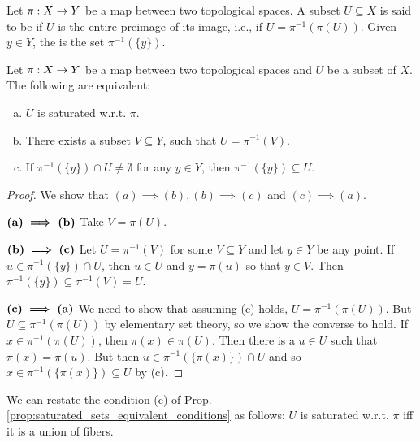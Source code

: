 \documentclass[11pt,a4paper]{article}
\begin{document}
\begin{definition}\label{def:saturated_set}
Let $\pi:X\rightarrow Y$ be a map between two topological spaces. A subset $U\subseteq X$ is said to be  if $U$ is the entire preimage of its image, i.e., if $U = \pi^{-1}(\pi(U))$. Given $y\in Y$, the  is the set $\pi^{-1}(\{y\})$.
\end{definition}

\begin{proposition}\label{prop:saturated_sets_equivalent_conditions}
Let $\pi:X\rightarrow Y$ be a map between two topological spaces and $U$ be a subset of $X$. The following are equivalent:
\begin{enumerate}[(a)]
    \item $U$ is saturated w.r.t. $\pi$.
    \item There exists a subset $V\subseteq Y$, such that $U=\pi^{-1}(V)$.
    \item If $\pi^{-1}(\{y\}) \cap U \neq \emptyset$ for any $y\in Y$, then $\pi^{-1}(\{y\})\subseteq U$.
\end{enumerate}
\end{proposition}

\begin{proof}
We show that $(a)\implies (b), (b)\implies(c)$ and $(c)\implies (a)$.

\noindent$\textbf{(a)}\boldsymbol{\implies}\textbf{(b)}$ Take $V = \pi(U)$.

\noindent$\textbf{(b)}\boldsymbol{\implies}\textbf{(c)}$ Let $U = \pi^{-1}(V)$ for some $V\subseteq Y$ and let $y\in Y$ be any point. If $u\in \pi^{-1}(\{y\})\cap U$, then $u\in U$ and $y = \pi(u)$ so that $y\in V$. Then $\pi^{-1}(\{y\})\subseteq \pi^{-1}(V) = U$.

\noindent$\textbf{(c)}\boldsymbol{\implies}\textbf{(a)}$ We need to show that assuming (c) holds, $U = \pi^{-1}(\pi(U))$. But $U\subseteq \pi^{-1}(\pi(U))$ by elementary set theory, so we show the converse to hold. If $x\in \pi^{-1}(\pi(U))$, then $\pi(x)\in \pi(U)$. Then there is a $u\in U$ such that $\pi(x) = \pi(u)$. But then $u\in \pi^{-1}(\{\pi(x)\})\cap U$ and so $x\in \pi^{-1}(\{\pi(x)\})\subseteq U$ by (c).
\end{proof}

\begin{remark}
We can restate the condition (c) of Prop. \ref{prop:saturated_sets_equivalent_conditions} as follows:
$U$ is saturated w.r.t. $\pi$ iff it is a union of fibers.
\end{remark}
\end{document}
